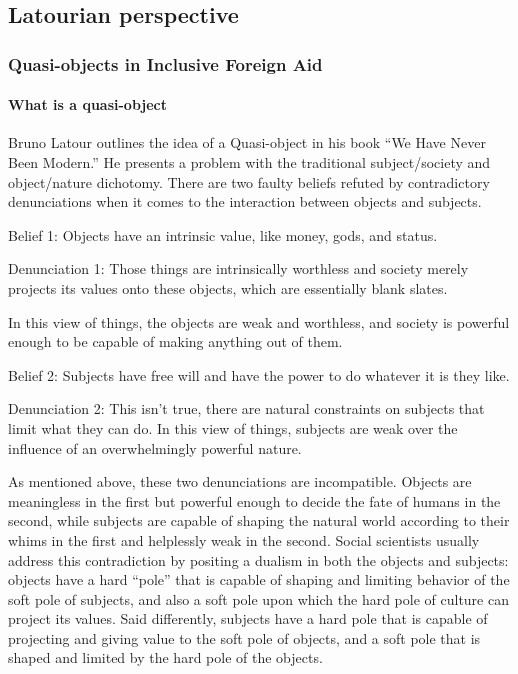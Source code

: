 \documentclass[a4paper]{article}
\begin{document}
\subsection{Latourian perspective}


\subsubsection{Quasi-objects in Inclusive Foreign Aid}

\paragraph{What is a quasi-object}

Bruno Latour outlines the idea of a Quasi-object in his book ``We Have Never
Been Modern.'' He presents a problem with the traditional subject/society and
object/nature dichotomy. There are two faulty beliefs refuted by contradictory
denunciations when it comes to the interaction between objects and subjects. 

Belief 1: Objects have an intrinsic value, like money, gods, and status. 

Denunciation 1: Those things are intrinsically worthless and society merely
projects its values onto these objects, which are essentially blank slates.

In this view of things, the objects are weak and worthless, and society is
powerful enough to be capable of making anything out of them.

Belief 2: Subjects have free will and have the power to do whatever it is they
like.

Denunciation 2: This isn't true, there are natural constraints on subjects
that limit what they can do.  In this view of things, subjects are weak over
the influence of an overwhelmingly powerful nature.

As mentioned above, these two denunciations are incompatible. Objects are
meaningless in the first but powerful enough to decide the fate of humans in
the second, while subjects are capable of shaping the natural world according
to their whims in the first and helplessly weak in the second. Social
scientists usually address this contradiction by positing a dualism in both
the objects and subjects: objects have a hard ``pole'' that is capable of
shaping and limiting behavior of the soft pole of subjects, and also a soft
pole upon which the hard pole of culture can project its values. Said
differently, subjects have a hard pole that is capable of projecting and
giving value to the soft pole of objects, and a soft pole that is shaped and
limited by the hard pole of the objects.
\end{document}

